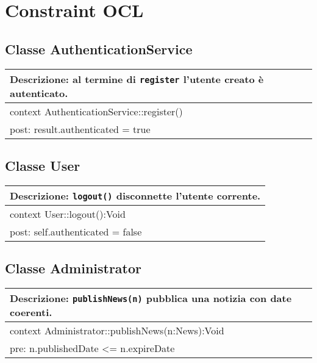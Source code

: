 \newpage
\section{Constraint OCL}

\subsection{Classe AuthenticationService}

\begin{table}[H]
  \centering
  \begin{tabular}{p{}}
    \toprule
    \textbf{Descrizione:} al termine di \texttt{register} l’utente creato è autenticato.\\
    \midrule
    context AuthenticationService::register()\\
    \quad post: result.authenticated = true\\
    \bottomrule
  \end{tabular}
\end{table}
\FloatBarrier





\subsection{Classe User}

\begin{table}[H]
  \centering
  \begin{tabular}{p{}}
    \toprule
    \textbf{Descrizione:} \texttt{logout()} disconnette l’utente corrente.\\
    \midrule
    context User::logout():Void\\
    \quad post: self.authenticated = false\\
    \bottomrule
  \end{tabular}
\end{table}
\FloatBarrier


\subsection{Classe Administrator}

\begin{table}[H]
  \centering
  \begin{tabular}{p{}}
    \toprule
    \textbf{Descrizione:} \texttt{publishNews(n)} pubblica una notizia con date coerenti.\\
    \midrule
    context Administrator::publishNews(n:News):Void\\
    \quad pre: n.publishedDate <= n.expireDate\\
    \bottomrule
  \end{tabular}
\end{table}


